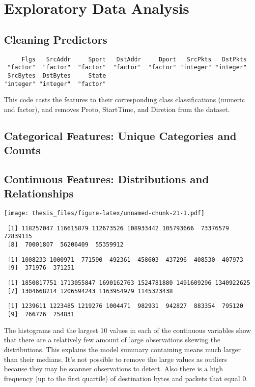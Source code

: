 \documentclass[12pt,twoside]{dukestatscithesis}
\theoremstyle{definition}
\theoremstyle{definition}
\theoremstyle{definition}
\theoremstyle{remark}
\begin{document}
\section{Exploratory Data Analysis}\label{exploratory-data-analysis}

\subsection{Cleaning Predictors}\label{cleaning-predictors}
\begin{verbatim}
     Flgs   SrcAddr     Sport   DstAddr     Dport   SrcPkts   DstPkts 
 "factor"  "factor"  "factor"  "factor"  "factor" "integer" "integer" 
 SrcBytes  DstBytes     State 
"integer" "integer"  "factor" 
\end{verbatim}
This code casts the features to their corresponding class
classifications (numeric and factor), and removes Proto, StartTime, and
Diretion from the dataset.

\subsection{Categorical Features: Unique Categories and
Counts}\label{categorical-features-unique-categories-and-counts}

\subsection{Continuous Features: Distributions and
Relationships}\label{continuous-features-distributions-and-relationships}

\texttt{[image: thesis\_files/figure-latex/unnamed-chunk-21-1.pdf]}
\begin{verbatim}
 [1] 118257047 116615879 112673526 108933442 105793666  73376579  72839115
 [8]  70001807  56206409  55359912
\end{verbatim}
\begin{verbatim}
 [1] 1008233 1000971  771590  492361  458603  437296  408530  407973
 [9]  371976  371251
\end{verbatim}
\begin{verbatim}
 [1] 1850817751 1713055847 1690162763 1524781880 1491609296 1340922625
 [7] 1304668214 1206594243 1163954979 1145323438
\end{verbatim}
\begin{verbatim}
 [1] 1239611 1223485 1219276 1004471  982931  942827  883354  795120
 [9]  766776  754831
\end{verbatim}
The histograms and the largest 10 values in each of the continuous
variables show that there are a relatively few amount of large
observations skewing the distributions. This explains the model summary
containing means much larger than their medians. It's not possible to
remove the large values as outliers because they may be scanner
observations to detect. Also there is a high frequency (up to the first
quartile) of destination bytes and packets that equal 0.
\end{document}
